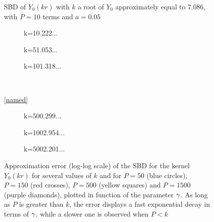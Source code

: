 \documentclass[smallextended]{svjour3}
\begin{document}
\begin{figure}[h]	      	
	\setlength{\plotwidth}{0.7\textwidth}
	\centering	
	
	\caption{SBD of $Y_0(kr)$ with $k$ a root of $Y_0$ approximately equal to $7.086$, with $P=10$ terms and $a=0.05$ }	      
	\label{Y0Example}
\end{figure}
\begin{figure}[h]  
	\centering
	\setlength{\plotwidth}{0.27\textwidth}
	\begin{subfigure}{\plotwidth}
		\caption{k=10.222...}
		\centering
				
	\end{subfigure}
	\begin{subfigure}{\plotwidth}		
		\caption{k=51.053...}
		\centering
		
	\end{subfigure}
	\begin{subfigure}{\plotwidth}		
		\caption{k=101.318...}
		\centering
		
	\end{subfigure}\\
																																															
	\vspace{0.3cm}	
																																															
	\ref{named}
																																															
	\vspace{0.3cm}	
																																																																						
	\begin{subfigure}{\plotwidth}
		\caption{k=500.299...}
		\centering
		
	\end{subfigure}
	\begin{subfigure}{\plotwidth}
		\caption{k=1002.954...}
		\centering
				
	\end{subfigure}
	\begin{subfigure}{\plotwidth}
		\caption{k=5002.201...}
		\centering
		
	\end{subfigure}	
	\caption{Approximation error (log-log scale) of the SBD for the kernel $Y_0(kr)$ for several values of $k$ and for $P=50$ (blue circles), $P=150$ (red crosses), $P=500$ (yellow squares) and $P=1500$ (purple diamonds), plotted in function of the parameter $\gamma$. As long as $P$ is greater than $k$, the error displays a fast exponential decay in terms of $\gamma$, while a slower one is observed when $P < k$}
	\label{HelmholtzConvSBD}
\end{figure}
																														
\end{document}
